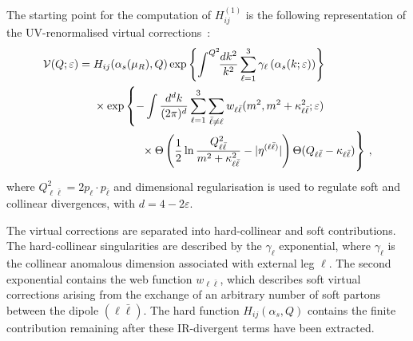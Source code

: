 The starting point for the computation of $H_{ij}^{(1)}$ is the
following representation of the UV-renormalised virtual
corrections~\cite{Banfi:2018mcq,Arpino:2019ozn}:
\begin{align}
  \mathcal{V}(Q;\varepsilon) ={}& H_{ij}(\alpha_s(\mu_R),Q) \exp\left\{\int^{Q^2}\!\!\frac{dk^2}{k^2}\sum_{\ell=1}^3 \gamma_\ell\left(\alpha_s(k;\varepsilon)\right)\right\}\nonumber\\
  &\times \exp\left\{-\int \frac{d^dk}{(2\pi)^d}\sum_{\ell=1}^3 \sum_{\bar \ell\ne \ell} w_{\ell \bar \ell}(m^2,m^2+\kappa_{\ell\bar \ell}^2;\varepsilon)\right.\nonumber\\
  &\qquad\qquad\left.\vphantom{\int \frac{d^dk}{(2\pi)^d}\sum_{\ell=1}^3 \sum_{\bar \ell\ne \ell}}\times\Theta\left(\frac 12\ln\frac{Q^2_{\ell\bar \ell}}{m^2+\kappa_{\ell\bar \ell}^2}-|\eta^{(\ell\bar \ell)}| \right) \Theta(Q_{\ell \bar \ell}-\kappa_{\ell\bar \ell})\right\}\,, \label{eq:HQ}
\end{align}
where $Q_{\ell\bar\ell}^2=2p_\ell\cdot p_{\bar\ell}$ and dimensional
regularisation is used to regulate soft and collinear divergences,
with $d=4-2\varepsilon$.  

The virtual corrections are separated into hard-collinear and soft
contributions. The hard-collinear singularities are described by the
$\gamma_\ell$ exponential, where $\gamma_\ell$ is the collinear anomalous
dimension associated with external leg $\ell$. The second exponential
contains the web function $w_{\ell\bar\ell}$, which describes soft
virtual corrections arising from the exchange of an arbitrary number of soft partons between
the dipole $(\ell\bar\ell)$. 
The hard function $H_{ij}(\alpha_s,Q)$ contains the finite contribution
remaining after these IR-divergent terms have been extracted.

